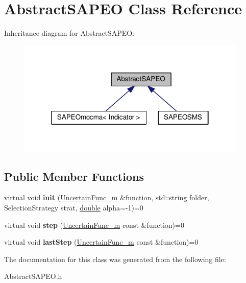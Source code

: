 \hypertarget{classAbstractSAPEO}{}\section{Abstract\+S\+A\+P\+EO Class Reference}
\label{classAbstractSAPEO}


Inheritance diagram for Abstract\+S\+A\+P\+EO\+:\nopagebreak
\begin{figure}[H]
\begin{center}
\leavevmode
\includegraphics[width=310pt]{classAbstractSAPEO__inherit__graph}
\end{center}
\end{figure}
\subsection*{Public Member Functions}
\begin{DoxyCompactItemize}
\item 
virtual void {\bfseries init} (\hyperlink{classUncertainFunc__m}{Uncertain\+Func\+\_\+m} \&function, std\+::string folder, Selection\+Strategy strat, \hyperlink{classdouble}{double} alpha=-\/1)=0\hypertarget{classAbstractSAPEO_a63c8d1e88bf7170e2dbc5dd95823a6f9}{}\label{classAbstractSAPEO_a63c8d1e88bf7170e2dbc5dd95823a6f9}

\item 
virtual void {\bfseries step} (\hyperlink{classUncertainFunc__m}{Uncertain\+Func\+\_\+m} const \&function)=0\hypertarget{classAbstractSAPEO_a907f10220d381acdfb24be037cbdbe17}{}\label{classAbstractSAPEO_a907f10220d381acdfb24be037cbdbe17}

\item 
virtual void {\bfseries last\+Step} (\hyperlink{classUncertainFunc__m}{Uncertain\+Func\+\_\+m} const \&function)=0\hypertarget{classAbstractSAPEO_a5d70904e2b4ee489709b299cedb146fd}{}\label{classAbstractSAPEO_a5d70904e2b4ee489709b299cedb146fd}

\end{DoxyCompactItemize}


The documentation for this class was generated from the following file\+:\begin{DoxyCompactItemize}
\item 
Abstract\+S\+A\+P\+E\+O.\+h\end{DoxyCompactItemize}
